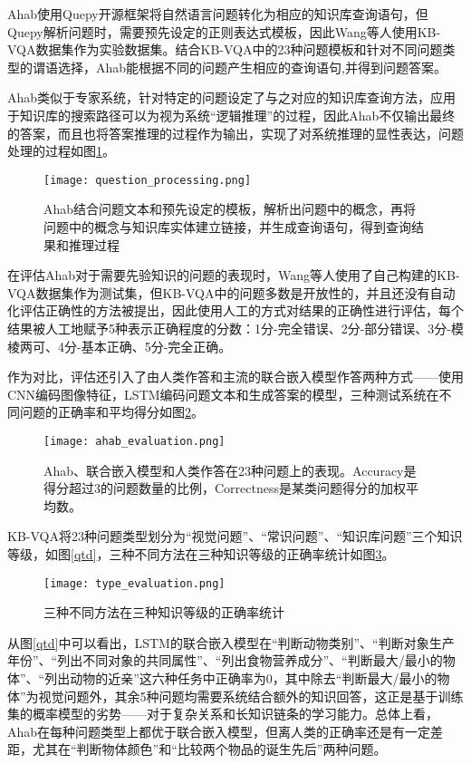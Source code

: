 Ahab使用Quepy开源框架将自然语言问题转化为相应的知识库查询语句，但Quepy解析问题时，需要预先设定的正则表达式模板，因此Wang等人使用KB-VQA数据集作为实验数据集。结合KB-VQA中的23种问题模板和针对不同问题类型的谓语选择，Ahab能根据不同的问题产生相应的查询语句,并得到问题答案。

Ahab类似于专家系统，针对特定的问题设定了与之对应的知识库查询方法，应用于知识库的搜索路径可以为视为系统“逻辑推理”的过程，因此Ahab不仅输出最终的答案，而且也将答案推理的过程作为输出，实现了对系统推理的显性表达，问题处理的过程如图\ref{question_processing}。
\begin{figure}[H]
	\centering
	\texttt{[image: question\_processing.png]}
	\caption{Ahab结合问题文本和预先设定的模板，解析出问题中的概念，再将问题中的概念与知识库实体建立链接，并生成查询语句，得到查询结果和推理过程}
	\label{question_processing}
\end{figure}

在评估Ahab对于需要先验知识的问题的表现时，Wang等人使用了自己构建的KB-VQA数据集作为测试集，但KB-VQA中的问题多数是开放性的，并且还没有自动化评估正确性的方法被提出，因此使用人工的方式对结果的正确性进行评估，每个结果被人工地赋予5种表示正确程度的分数：1分-完全错误、2分-部分错误、3分-模棱两可、4分-基本正确、5分-完全正确。

作为对比，评估还引入了由人类作答和主流的联合嵌入模型作答两种方式——使用CNN编码图像特征，LSTM编码问题文本和生成答案的模型，三种测试系统在不同问题的正确率和平均得分如图\ref{ahab_evaluation}。
\begin{figure}[H]
	\centering
	\texttt{[image: ahab\_evaluation.png]}
	\caption{Ahab、联合嵌入模型和人类作答在23种问题上的表现。Accuracy是得分超过3的问题数量的比例，Correctness是某类问题得分的加权平均数。}
	\label{ahab_evaluation}
\end{figure}
KB-VQA将23种问题类型划分为“视觉问题”、“常识问题”、“知识库问题”三个知识等级，如图\ref{qtd}，三种不同方法在三种知识等级的正确率统计如图\ref{type_evaluation}。
\begin{figure}[H]
	\centering
	\texttt{[image: type\_evaluation.png]}
	\caption{三种不同方法在三种知识等级的正确率统计}
	\label{type_evaluation}
\end{figure}

从图\ref{qtd}中可以看出，LSTM的联合嵌入模型在“判断动物类别”、“判断对象生产年份”、“列出不同对象的共同属性”、“列出食物营养成分”、“判断最大/最小的物体”、“列出动物的近亲”这六种任务中正确率为0，其中除去“判断最大/最小的物体”为视觉问题外，其余5种问题均需要系统结合额外的知识回答，这正是基于训练集的概率模型的劣势——对于复杂关系和长知识链条的学习能力。总体上看，Ahab在每种问题类型上都优于联合嵌入模型，但离人类的正确率还是有一定差距，尤其在“判断物体颜色”和“比较两个物品的诞生先后”两种问题。

